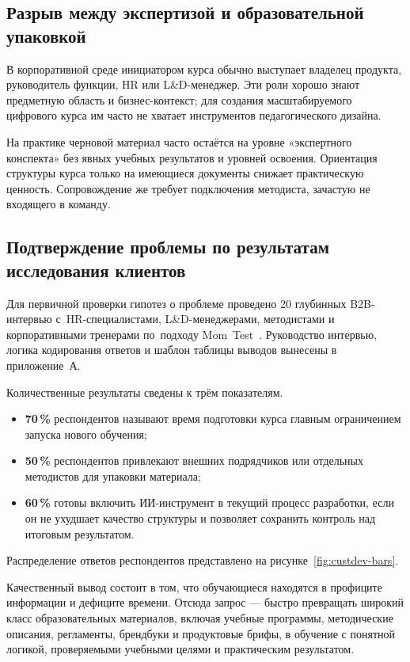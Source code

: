 \subsection{Разрыв между экспертизой и образовательной упаковкой}

В корпоративной среде инициатором
курса обычно выступает владелец продукта, руководитель функции, HR или
L\&D-менеджер. Эти роли хорошо знают предметную область и
бизнес-контекст; для создания масштабируемого цифрового курса им часто
не хватает инструментов педагогического дизайна.

На практике черновой материал часто остаётся на уровне «экспертного
конспекта» без явных
учебных результатов и уровней освоения. Ориентация структуры курса
только на имеющиеся документы снижает практическую ценность.
Сопровождение же требует
подключения методиста, зачастую не входящего в команду.

\subsection{Подтверждение проблемы по результатам исследования клиентов}

Для первичной проверки гипотез о проблеме проведено 20 глубинных
B2B-интервью с~HR-специалистами, L\&D-менеджерами, методистами и
корпоративными тренерами по~подходу Mom~Test~\cite{fitzpatrick_mom_test_2013}.
Руководство интервью, логика кодирования ответов и шаблон таблицы выводов
вынесены в приложение~А.

Количественные результаты сведены к трём показателям.

\begin{itemize}
  \item \textbf{70\,\%} респондентов называют время подготовки курса
    главным ограничением запуска нового обучения;
  \item \textbf{50\,\%} респондентов привлекают внешних подрядчиков
    или отдельных методистов для упаковки материала;
  \item \textbf{60\,\%} готовы включить ИИ-инструмент в
    текущий процесс разработки, если он не ухудшает качество
    структуры и позволяет сохранить контроль над итоговым результатом.
\end{itemize}

Распределение ответов респондентов представлено на рисунке~\ref{fig:custdev-bars}.



Качественный вывод состоит в том, что обучающиеся находятся в
профиците информации и дефиците времени. Отсюда запрос — быстро превращать
широкий класс образовательных материалов, включая учебные программы,
методические описания, регламенты, брендбуки и продуктовые брифы, в обучение
с понятной логикой, проверяемыми учебными целями и практическим результатом.

